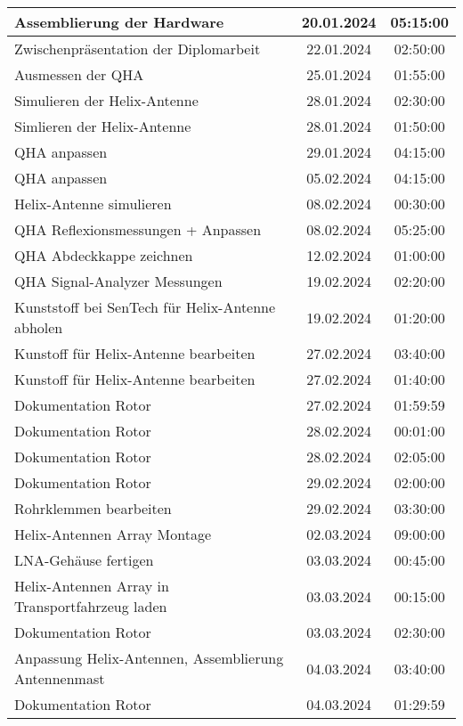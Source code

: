\begin{longtable}{|l|c|c|}
	\hline
	Assemblierung der Hardware & 20.01.2024 & 05:15:00 \\
	\hline
	Zwischenpräsentation der Diplomarbeit & 22.01.2024 & 02:50:00 \\
	\hline
	Ausmessen der QHA & 25.01.2024 & 01:55:00 \\
	\hline
	Simulieren der Helix-Antenne & 28.01.2024 & 02:30:00 \\
	\hline
	Simlieren der Helix-Antenne & 28.01.2024 & 01:50:00 \\
	\hline
	QHA anpassen & 29.01.2024 & 04:15:00 \\
	\hline
	QHA anpassen & 05.02.2024 & 04:15:00 \\
	\hline
	Helix-Antenne simulieren & 08.02.2024 & 00:30:00 \\
	\hline
	QHA Reflexionsmessungen + Anpassen & 08.02.2024 & 05:25:00 \\
	\hline
	QHA Abdeckkappe zeichnen & 12.02.2024 & 01:00:00 \\
	\hline
	QHA Signal-Analyzer Messungen & 19.02.2024 & 02:20:00 \\
	\hline
	Kunststoff bei SenTech für Helix-Antenne abholen & 19.02.2024 & 01:20:00 \\
	\hline
	Kunstoff für Helix-Antenne bearbeiten & 27.02.2024 & 03:40:00 \\
	\hline
	Kunstoff für Helix-Antenne bearbeiten & 27.02.2024 & 01:40:00 \\
	\hline
	Dokumentation Rotor & 27.02.2024 & 01:59:59 \\
	\hline
	Dokumentation Rotor & 28.02.2024 & 00:01:00 \\
	\hline
	Dokumentation Rotor  & 28.02.2024 & 02:05:00 \\
	\hline
	Dokumentation Rotor & 29.02.2024 & 02:00:00 \\
	\hline
	Rohrklemmen bearbeiten & 29.02.2024 & 03:30:00 \\
	\hline
	Helix-Antennen Array Montage & 02.03.2024 & 09:00:00 \\
	\hline
	LNA-Gehäuse fertigen & 03.03.2024 & 00:45:00 \\
	\hline
	Helix-Antennen Array  in Transportfahrzeug laden & 03.03.2024 & 00:15:00 \\
	\hline
	Dokumentation Rotor & 03.03.2024 & 02:30:00 \\
	\hline
	Anpassung Helix-Antennen, Assemblierung Antennenmast & 04.03.2024 & 03:40:00 \\
	\hline
	Dokumentation Rotor & 04.03.2024 & 01:29:59 \\

\end{longtable}
